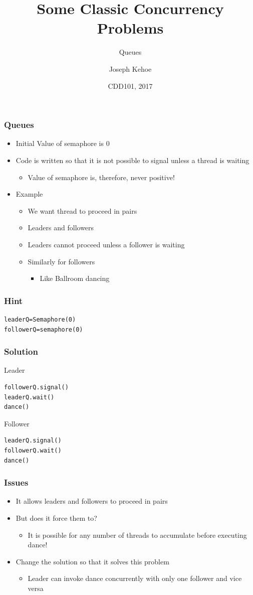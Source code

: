 \documentclass{beamer}
\title[Concurrency] %
{Some Classic Concurrency Problems}
\subtitle{Queues}
\author[Dr. Joseph Kehoe] %
{Joseph Kehoe\inst{1}}
\institute[IT Carlow] %
{
	\inst{1}%
	Department of Computing and Networking\\
	Institute of Technology Carlow
}
\date[ITC 2017] %
{CDD101, 2017}
\begin{document}
 
\frame{\titlepage}
 
 

\begin{frame}
\frametitle{Queues}
\begin{itemize}
\item Initial Value of semaphore is 0
\item Code is written so that it is not possible to signal unless a thread is waiting
	\begin{itemize}
	\item Value of semaphore is, therefore, never positive!
	\end{itemize}
\item Example
	\begin{itemize}
	\item We want thread to proceed in pairs
	\item Leaders and followers
	\item Leaders cannot proceed unless a follower is waiting
	\item Similarly for followers
		\begin{itemize}
		\item Like Ballroom dancing
		\end{itemize}
	\end{itemize}
\end{itemize}
\end{frame}


\begin{frame}[fragile]
\frametitle{Hint}
\begin{verbatim}
leaderQ=Semaphore(0)
followerQ=semaphore(0)
\end{verbatim}
\end{frame}


\begin{frame}[fragile]
	\frametitle{Solution}
	Leader
	\begin{verbatim}
followerQ.signal()
leaderQ.wait()
dance()
\end{verbatim}
	Follower
	\begin{verbatim}
leaderQ.signal()
followerQ.wait()
dance()
\end{verbatim}

\end{frame}

\begin{frame}[fragile]
	\frametitle{Issues}
\begin{itemize}
	\item It allows leaders and followers to proceed in pairs
	\item But does it force them to?
	\begin{itemize}
	\item It is possible for any number of threads to accumulate before executing dance!
\end{itemize}
	\item Change the solution so that it solves this problem
	\begin{itemize}
	\item Leader can invoke dance concurrently with only one follower and vice versa
	\end{itemize}
\end{itemize}
\end{frame}
\end{document}
